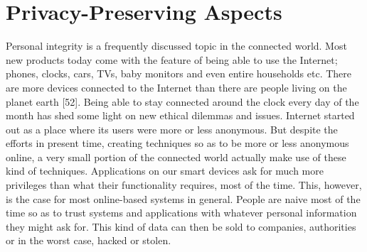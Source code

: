 \chapter{Privacy-Preserving Aspects}
Personal integrity is a frequently discussed topic in the connected world.
Most new products today come with the feature of being able to use the Internet; phones, clocks, cars, TVs, baby monitors and even entire households etc.
There are more devices connected to the Internet than there are people living on the planet earth [52]. Being able to stay connected around the clock every day of the month has shed some light on new ethical dilemmas and issues. Internet started out as a place where its users were more or less anonymous. But despite the efforts in present time, creating techniques so as to be more or less anonymous online, a very small portion of the connected world actually make use of these kind of techniques. Applications on our smart devices ask for much more privileges than what their functionality
requires, most of the time. This, however, is the case for most online-based systems in general. People are naive most of the time so as to trust systems and applications with whatever personal information they might ask for. This kind of data can then be sold to companies, authorities or in the worst case, hacked or stolen.


